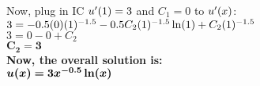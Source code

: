 \documentclass{article}
\begin{document}
\begin{enumerate}
\begin{enumerate}
Now, plug in IC $u\sp\prime(1)=3$ and $C_1 = 0$ to $u\sp\prime(x)$:\\
$3 = -0.5(0)(1)\sp{-1.5} - 0.5C_2(1)\sp{-1.5}\ln(1) + C_2(1)\sp{-1.5}$\\
$3 = 0 - 0 + C_2$\\
$\bm{C_2 = 3}$\\

\textbf{Now, the overall solution is:}\\
$\bm{u(x) =  3x\sp{-0.5}\ln(x)}$\\

\end{enumerate}


\end{enumerate}
\end{document}
